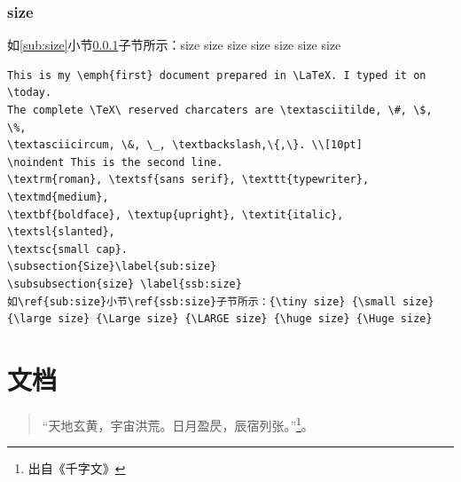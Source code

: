 \documentclass[a4paper]{article} %
\numberwithin{equation}{section} %
\begin{document}
\subsubsection{size} \label{ssb:size}
如\ref{sub:size}小节\ref{ssb:size}子节所示：{\tiny size} {\small size} 
{\large size} {\Large size} {\LARGE size} {\huge size} {\Huge size}

\begin{verbatim}
This is my \emph{first} document prepared in \LaTeX. I typed it on \today.
The complete \TeX\ reserved charcaters are \textasciitilde, \#, \$, \%, 
\textasciicircum, \&, \_, \textbackslash,\{,\}. \\[10pt]
\noindent This is the second line.
\textrm{roman}, \textsf{sans serif}, \texttt{typewriter}, \textmd{medium}, 
\textbf{boldface}, \textup{upright}, \textit{italic}, \textsl{slanted}, 
\textsc{small cap}.
\subsection{Size}\label{sub:size}
\subsubsection{size} \label{ssb:size}
如\ref{sub:size}小节\ref{ssb:size}子节所示：{\tiny size} {\small size} 
{\large size} {\Large size} {\LARGE size} {\huge size} {\Huge size}
\end{verbatim}

\section{文档}

\begin{quote}
“天地玄黄，宇宙洪荒。日月盈昃，辰宿列张。”\footnote{出自《千字文》}。
\end{quote}
\end{document}
